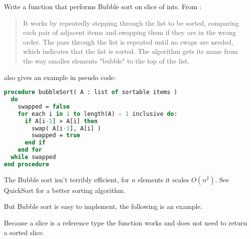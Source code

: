 \begin{Exercise}[title={Bubble sort},difficulty=5]
\label{ex:bubble}
\Question\label{ex:bubble q1} Write a function that performs 
Bubble sort on slice of ints. From \cite{bubblesort}:
\begin{quote}
It works by repeatedly stepping through the list to be sorted, comparing each
pair of adjacent items and swapping them if they are in the wrong order. The
pass through the list is repeated until no swaps are needed, which indicates
that the list is sorted. The algorithm gets its name from the way smaller
elements "bubble" to the top of the list. 
\end{quote}

\cite{bubblesort} also gives an example in pseudo code:
\begin{lstlisting}[language=pascal]
procedure bubbleSort( A : list of sortable items )
  do
    swapped = false
    for each i in 1 to length(A) - 1 inclusive do:
      if A[i-1] > A[i] then
        swap( A[i-1], A[i] )
        swapped = true
      end if
    end for
  while swapped
end procedure
\end{lstlisting}
\end{Exercise}

\begin{Answer}
\Question 
The Bubble sort isn't terribly efficient, for $n$ elements it scales
$O(n^2)$. See QuickSort \cite{quicksort} for a better sorting algorithm.

But Bubble sort is easy to implement, the following is an example.


Because a slice is a reference type the  function works and
does not need to return a sorted slice.
\end{Answer}
